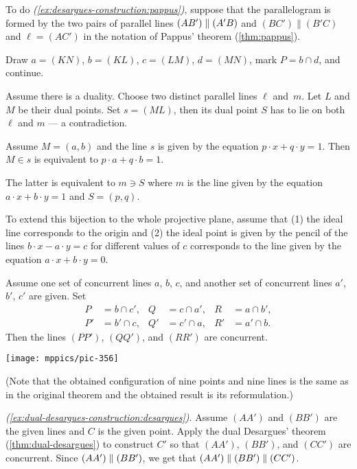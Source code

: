 \begin{multicols}{2}
To do \textit{(\ref{ex:desargues-construction:pappus})}, suppose that the parallelogram is formed by the two pairs of parallel lines $(AB')\z\parallel (A'B)$ and $(BC')\parallel(B'C)$ and $\ell=(AC')$ in the notation of Pappus' theorem (\ref{thm:pappus}).

Draw $a=(KN)$, $b=(KL)$, $c=(LM)$, $d=(MN)$, mark $P=b\cap d$, and continue. 

Assume there is a duality.
Choose two distinct parallel lines $\ell$ and~$m$.
Let $L$ and $M$ be their dual points.
Set $s=(ML)$, then its dual point $S$ has to lie on both $\ell$ and $m$ --- a contradiction.

Assume $M=(a,b)$ 
and the line $s$ is given by the equation $p\cdot x+q\cdot y=1$.
Then $M\in s$ is equivalent to $p\cdot a+q\cdot b=1$.

The latter is equivalent to $m\ni S$
where $m$ is the line given by the equation 
$a\cdot x+b\cdot y=1$ and $S=(p,q)$.

To extend this bijection to the whole projective plane, assume that 
(1) the ideal line corresponds to the origin 
and (2) the ideal point is given by the pencil of the lines $b\cdot x-a\cdot y=c$ for different values of $c$ corresponds to the line given by the equation $a\cdot x+b\cdot y=0$.


Assume one set of concurrent lines $a$, $b$, $c$, 
and another set of concurrent lines $a'$, $b'$, $c'$ are given.
Set 
\begin{align*}
P&=b\cap c',
&
Q&=c\cap a',
&
R&=a\cap b',\\
P'&=b'\cap c,
&
Q'&=c'\cap a,
&
R'&=a'\cap b.
\end{align*}
Then the lines $(PP')$, $(QQ')$, and $(RR')$ are concurrent.

\begin{Figure}
\vskip-0mm
\centering
\texttt{[image: mppics/pic-356]}
\vskip-0mm
\end{Figure}

(Note that the obtained configuration of nine points and nine lines is the same as in the original theorem and the obtained result is its reformulation.)

\parbf{\ref{ex:dual-desargues-construction},} \textit{(\ref{ex:dual-desargues-construction:desargues})}.
Assume $(AA')$ and $(BB')$ are the given lines and $C$ is the given point.
Apply the dual Desargues' theorem (\ref{thm:dual-desargues}) to construct $C'$ so that $(AA')$, $(BB')$, and $(CC')$ are concurrent. 
Since $(AA')\z\parallel (BB')$, 
we get that 
$(AA')\z\parallel (BB')\z\parallel (CC')$.


\end{multicols}
